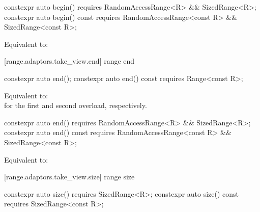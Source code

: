 %
\begin{itemdecl}
constexpr auto begin() requires RandomAccessRange<R> && SizedRange<R>;
constexpr auto begin() const
  requires RandomAccessRange<const R> && SizedRange<const R>;
\end{itemdecl}

\begin{itemdescr}
\pnum
\effects Equivalent to: 
\end{itemdescr}

[range.adaptors.take_view.end]{ range end}

%
\begin{itemdecl}
constexpr auto end();
constexpr auto end() const requires Range<const R>;
\end{itemdecl}

\begin{itemdescr}

\pnum
\effects Equivalent to:
 \\
 for the first and second overload, respectively.
\end{itemdescr}

%
\begin{itemdecl}
constexpr auto end() requires RandomAccessRange<R> && SizedRange<R>;
constexpr auto end() const
  requires RandomAccessRange<const R> && SizedRange<const R>;
\end{itemdecl}

\begin{itemdescr}
\pnum
\effects Equivalent to: 
\end{itemdescr}

[range.adaptors.take_view.size]{ range size}

%
\begin{itemdecl}
constexpr auto size() requires SizedRange<R>;
constexpr auto size() const requires SizedRange<const R>;
\end{itemdecl}

